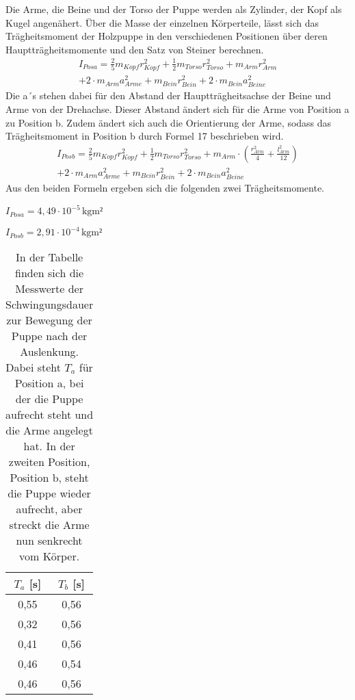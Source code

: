 \documentclass[titlepage = firstcover]{scrartcl}
\begin{document}
      Die Arme, die Beine und der Torso der Puppe werden als Zylinder, der Kopf als Kugel angenähert.
      Über die Masse der einzelnen Körperteile, lässt sich das Trägheitsmoment der Holzpuppe in den verschiedenen Positionen über deren Hauptträgheitsmomente und 
      den Satz von Steiner berechnen.
      \begin{equation}
        \begin{split}
          I_{Posa} = \frac{2}{5} m_{Kopf}r_{Kopf}^2 + \frac{1}{2} m_{Torso} r_{Torso}^2 + m_{Arm} r_{Arm}^2 \\
                    + 2 \cdot m_{Arm} a_{Arme}^2 + m_{Bein} r_{Bein}^2 + 2 \cdot m_{Bein} a_{Beine}^2
        \end{split}
      \end{equation}
      Die a´s stehen dabei für den Abstand der Hauptträgheitsachse der Beine und Arme von der Drehachse. Dieser Abstand ändert sich für die Arme von Position a 
      zu Position b. Zudem ändert sich auch die Orientierung der Arme, sodass das Trägheitsmoment in Position b durch Formel 17 beschrieben wird. 
      \begin{equation}
        \begin{split}
          I_{Posb} = \frac{2}{5} m_{Kopf}r_{Kopf}^2 + \frac{1}{2} m_{Torso} r_{Torso}^2 + m_{Arm} \cdot (\frac{r_{Arm}^2}{4} + \frac{l_{Arm}^2}{12}) \\
                      + 2 \cdot m_{Arm} a_{Arme}^2 + m_{Bein} r_{Bein}^2 + 2 \cdot m_{Bein} a_{Beine}^2
        \end{split}
      \end{equation}
      Aus den beiden Formeln ergeben sich die folgenden zwei Trägheitsmomente.\newline
      
      $I_{Posa} = 4,49 \cdot 10^{-5} \, \text{kgm²}$ \newline
      
      $I_{Posb} = 2,91 \cdot 10^{-4} \, \text{kgm²}$
      \newpage
      \begin{table}[h]
        \centering
        \caption{In der Tabelle finden sich die Messwerte der Schwingungsdauer zur Bewegung der Puppe nach der Auslenkung. Dabei steht $T_a$ für Position a, bei der die Puppe aufrecht steht und die Arme angelegt hat. In der zweiten Position, Position b, steht die Puppe wieder aufrecht, aber streckt die Arme nun senkrecht vom Körper.}
        \label{tab:Tabelle_4}

        \begin{tabular}{c c}
          \toprule
          {$T_a$ [s]} & {$T_b$ [s]} \\
          \midrule
          0,55 & 0,56 \\
          0,32 & 0,56 \\
          0,41 & 0,56 \\ 
          0,46 & 0,54 \\
          0,46 & 0,56 \\
          \bottomrule
        \end{tabular}
      \end{table}  
      
\end{document}
